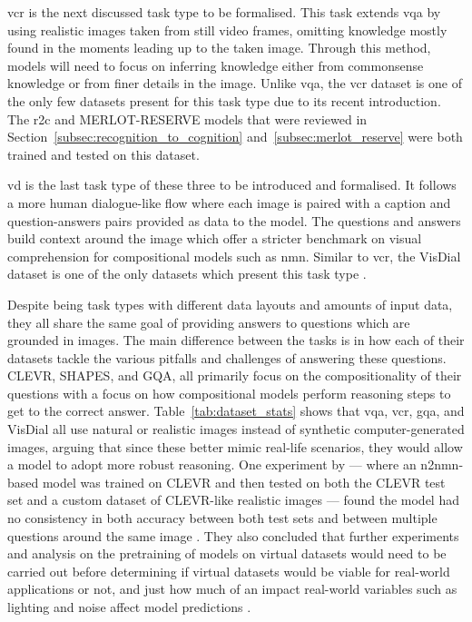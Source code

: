 \gls{vcr} is the next discussed task type to be formalised\cite{zellers_recognition_2019}.
This task extends \gls{vqa} by using realistic images taken from still video frames, omitting knowledge mostly found in the moments leading up to the taken image.
Through this method, models will need to focus on inferring knowledge either from commonsense knowledge or from finer details in the image.
Unlike \gls{vqa}, the \gls{vcr} dataset\cite{zellers_recognition_2019} is one of the only few datasets present for this task type due to its recent introduction.
The \gls{r2c} and MERLOT-RESERVE models that were reviewed in Section~\ref{subsec:recognition_to_cognition} and~\ref{subsec:merlot_reserve} were both trained and tested on this dataset.

\gls{vd} is the last task type of these three to be introduced and formalised\cite{das_visual_2019}.
It follows a more human dialogue-like flow where each image is paired with a caption and question-answers pairs provided as data to the model.
The questions and answers build context around the image which offer a stricter benchmark on visual comprehension for compositional models such as \gls{nmn}.
Similar to \gls{vcr}, the VisDial dataset is one of the only datasets which present this task type \cite{das_visual_2019}.

Despite being task types with different data layouts and amounts of input data, they all share the same goal of providing answers to questions which are grounded in images.
The main difference between the tasks is in how each of their datasets tackle the various pitfalls and challenges of answering these questions.
CLEVR, SHAPES, and GQA, all primarily focus on the compositionality of their questions with a focus on how compositional models perform reasoning steps to get to the correct answer\cite{andreas_neural_2016,johnson_clevr_2016,hudson_gqa_2019}.
Table~\ref{tab:dataset_stats} shows that \gls{vqa}, \gls{vcr}, \gls{gqa}, and VisDial all use natural or realistic images instead of synthetic computer-generated images, arguing that since these better mimic real-life scenarios, they would allow a model to adopt more robust reasoning\cite{agrawal_vqa_2016,hudson_gqa_2019,zellers_recognition_2019,das_visual_2019}.
One experiment by \cite{sejnova_compositional_2018} --- where an \gls{n2nmn}-based model was trained on CLEVR and then tested on both the CLEVR test set and a custom dataset of CLEVR-like realistic images --- found the model had no consistency in both accuracy between both test sets and between multiple questions around the same image \cite{sejnova_compositional_2018}.
They also concluded that further experiments and analysis on the pretraining of models on virtual datasets would need to be carried out before determining if virtual datasets would be viable for real-world applications or not, and just how much of an impact real-world variables such as lighting and noise affect model predictions \cite{sejnova_compositional_2018}.

